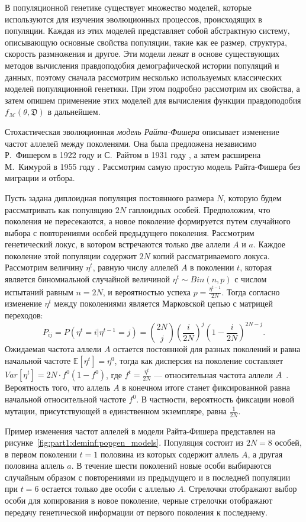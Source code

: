 В популяционной генетике существует множество моделей, которые используются для изучения эволюционных процессов, происходящих в популяции.
Каждая из этих моделей представляет собой абстрактную систему, описывающую основные свойства популяции, такие как ее размер, структура, скорость размножения и другое.
Эти модели лежат в основе существующих методов вычисления правдоподобия демографической истории популяций и данных, поэтому сначала рассмотрим несколько используемых классических моделей популяционной генетики.
При этом подробно рассмотрим их свойства, а затем опишем применение этих моделей для вычисления функции правдоподобия $f_\mathcal{M}(\theta, \mathfrak{D})$ в дальнейшем.

Стохастическая эволюционная \emph{модель Райта-Фишера} описывает изменение частот аллелей между поколенями.
Она была предложена независимо Р.~Фишером в 1922 году \cite{fisher1923xxi} и С.~Райтом в 1931 году \cite{wright1931evolution}, а затем расширена М.~Кимурой в 1955 году \cite{kimura1954stochastic}.
Рассмотрим самую простую модель Райта-Фишера без миграции и отбора.

Пусть задана диплоидная популяция постоянного размера $N$, которую будем рассматривать как популяцию $2N$ гаплоидных особей.
Предположим, что поколения не пересекаются, а новое поколение формируется путем случайного выбора с повторениями особей предыдущего поколения.
Рассмотрим генетический локус, в котором встречаются только две аллели $A$ и $a$.
Каждое поколение этой популяции содержит $2N$ копий рассматриваемого локуса.
Рассмотрим величину $\eta^t$, равную числу аллелей $A$ в поколении $t$, которая является биномиальной случайной величиной $\eta^t \sim Bin(n, p)$ с числом испытаний равным $n=2N$, и вероятностью успеха $p=\frac{\eta^{t-1}}{2N}$.
Тогда согласно изменение $\eta^t$ между поколениями является Марковской цепью с матрицей переходов:
$$P_{ij} = P(\eta^t = i | \eta^{t-1} = j) = \binom{2N}{j} \left(\frac{i}{2N}\right)^j \left(1 - \frac{i}{2N}\right)^{2N-j}.$$
Ожидаемая частота аллели $A$ остается постоянной для разных поколений и равна начальной частоте $ \mathbb{E}[\eta^t] = \eta^0$, тогда как дисперсия на поколение составляет $Var[\eta^t]=2N\cdot f^0(1 - f^0)$, где $f^t = \frac{\eta^t}{2N}$ --- относительная частота аллели $A$~\cite{wakeley2009coalescent}. Вероятность того, что аллель $A$ в конечном итоге станет фиксированной равна начальной относительной частоте $f^0$.
В частности, вероятность фиксации новой мутации, присутствующей в единственном экземпляре, равна $\frac{1}{2N}$.

Пример изменения частот аллелей в модели Райта-Фишера представлен на рисунке~\ref{fig:part1:deminf:popgen_models}.
Популяция состоит из $2N = 8$ особей, в первом поколении $t=1$ половина из которых содержит аллель $A$, а другая половина аллель $a$.
В течение шести поколений новые особи выбираются случайным образом с повторениями из предыдущего и в последней популяции при $t=6$ остается только две особи с аллелью $A$.
Стрелочки отображают выбор особи для копирования в новое поколение, черные стрелочки отображают передачу генетической информации от первого поколения к последнему.

